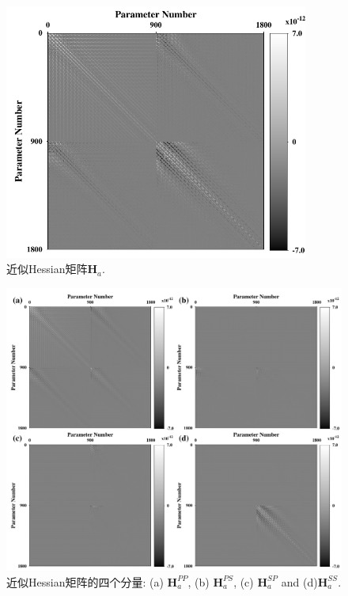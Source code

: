 \begin{figure}[!htb]
    \begin{center}
        \includegraphics[width=10cm]{Figure/chapter02/ResoOpera/Fig/hessian.pdf}
        \caption{
            近似Hessian矩阵$\mathbf{H}_a$.
    }
    \label{fig:Hessian} 
    \end{center}
\end{figure}
\begin{figure}[!htb]
    \begin{center}
        \includegraphics[width=12cm]{Figure/chapter02/ResoOpera/Fig/fourhessian.pdf}
        \caption{
            近似Hessian矩阵的四个分量:
                        (a) $\mathbf{H}_a^{PP}$,
            (b) $\mathbf{H}_a^{PS}$, (c) $\mathbf{H}_a^{SP}$ and (d)$\mathbf{H}_a^{SS}$.
    }
    \label{fig:fourHessian}
    \end{center}
\end{figure}
